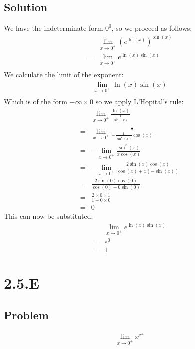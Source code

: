 \documentclass[12pt]{article}
\newcommand{\round}[1]{\left(       #1 \right)      }
\begin{document}
\subsection*{Solution}
We have the indeterminate form $0^0$, so we proceed as follows:
\begin{align*}
     & \lim_{x \to 0^+} \round{e^{\ln(x)}}^{\sin(x)} \\
    =& \lim_{x \to 0^+} e^{\ln(x) \sin(x)} \\
\end{align*}
We calculate the limit of the exponent:
\begin{align*}
    \lim_{x \to 0^+} \ln(x) \sin(x) \\
\end{align*}
Which is of the form $-\infty \times 0$ so we apply L'Hopital's rule:
\begin{align*}
     & \lim_{x \to 0^+} \frac{\ln(x)}{\frac{1}{\sin(x)}} \\
    =& \lim_{x \to 0^+} \frac{\frac{1}{x}}{-\frac{1}{\sin^2(x)} \cos(x)} \\
    =& -\lim_{x \to 0^+} \frac{\sin^2(x)}{x\cos(x)} \\
    =& -\lim_{x \to 0^+} \frac{2\sin(x) \cos(x)}{\cos(x) + x (-\sin(x))} \\
    =& \frac{2 \sin(0) \cos(0)}{\cos(0) - 0 \sin(0)} \\
    =& \frac{2 \times 0 \times 1}{1 - 0 \times 0} \\
    =& 0
\end{align*}
This can now be substituted:
\begin{align*}
     & \lim_{x \to 0^+} e^{\ln(x) \sin(x)} \\
    =& e^0 \\
    =& 1
\end{align*}



\section*{2.5.E}

\subsection*{Problem}
\begin{align*}
    \lim_{x \to 0^+} x^{x^x}
\end{align*}
\end{document}
